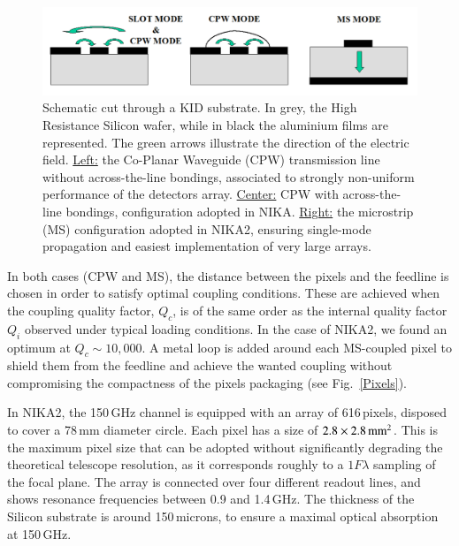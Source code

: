 \documentclass[]{aa} %
\begin{document}
\begin{figure}[h]
   \centering
    \includegraphics[width=.95\linewidth]{CPWvsMS.png}
      \caption{Schematic cut through a KID substrate. In grey, the High Resistance Silicon wafer, while in black the aluminium films are represented. The green arrows illustrate the direction of the electric field. \underline{Left:} the Co-Planar Waveguide (CPW) transmission line without across-the-line bondings, associated to strongly non-uniform performance of the detectors array. \underline{Center:} CPW with across-the-line bondings, configuration adopted in NIKA. \underline{Right:} the microstrip (MS) configuration adopted in NIKA2, ensuring single-mode propagation and easiest implementation of very large arrays.}
         \label{CPWvsMS}
\end{figure}

In both cases (CPW and MS), the distance between the pixels and the feedline is chosen in order to satisfy optimal coupling conditions. These are achieved when the coupling quality factor, $Q_c$, is of the same order as the internal quality factor $Q_i$ observed under typical loading conditions. In the case of NIKA2, we found an optimum at $Q_c\sim10,000$. A metal loop is added around each MS-coupled pixel to shield them from the feedline and achieve the wanted coupling without compromising the compactness of the pixels packaging (see Fig.~\ref{Pixels}). 

In NIKA2, the 150\,GHz channel is equipped with an array of 616\,pixels, disposed to cover a 78\,mm diameter circle. Each pixel has a size of $2.8\times2.8\textrm{\,mm}^2$. This is the maximum pixel size that can be adopted without significantly degrading the theoretical telescope resolution, as it corresponds roughly to a $1 F \lambda$ sampling of the focal plane. The array is connected over four different readout lines, and shows resonance frequencies between 0.9 and 1.4\,GHz. The thickness of the Silicon substrate is around 150\,microns, to ensure a maximal optical absorption at 150\,GHz. 
\end{document}
